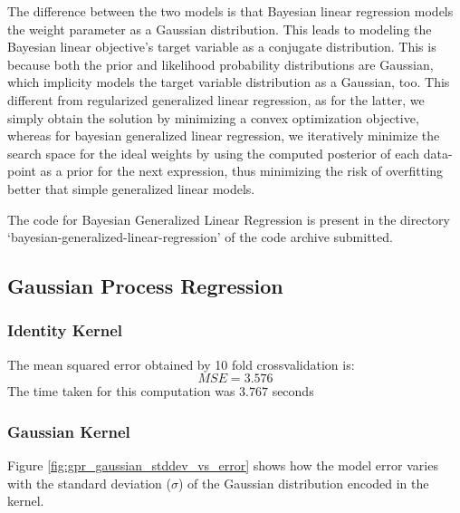 \documentclass[parskip=full]{scrartcl}
\begin{document}
            The difference between the two models is that Bayesian linear regression models the weight parameter as a Gaussian distribution. This leads to modeling the Bayesian linear objective's target variable as a conjugate distribution. This is because both the prior and likelihood probability distributions are Gaussian, which implicity models the target variable distribution as a Gaussian, too. This different from regularized generalized linear regression, as for the latter, we simply obtain the solution by minimizing a convex optimization objective, whereas for bayesian generalized linear regression, we iteratively minimize the search space for the ideal weights by using the computed posterior of each data-point as a prior for the next expression, thus minimizing the risk of overfitting better that simple generalized linear models.
        

        The code for Bayesian Generalized Linear Regression is present in the directory `bayesian-generalized-linear-regression' of the code archive submitted.
    

    \subsection{Gaussian Process Regression} %
    \label{sub:gaussian_process_regression}

        \subsubsection*{Identity Kernel} %
        \label{ssub:identity_kernel}

        The mean squared error obtained by 10 fold crossvalidation is:
        $$MSE = 3.576$$
        The time taken for this computation was $3.767$ seconds
        

        \subsubsection*{Gaussian Kernel} %
        \label{ssub:gaussian_kernel}

            Figure \ref{fig:gpr_gaussian_stddev_vs_error} shows how the model error varies with the standard deviation ($\sigma$) of the Gaussian distribution encoded in the kernel.
\end{document}
